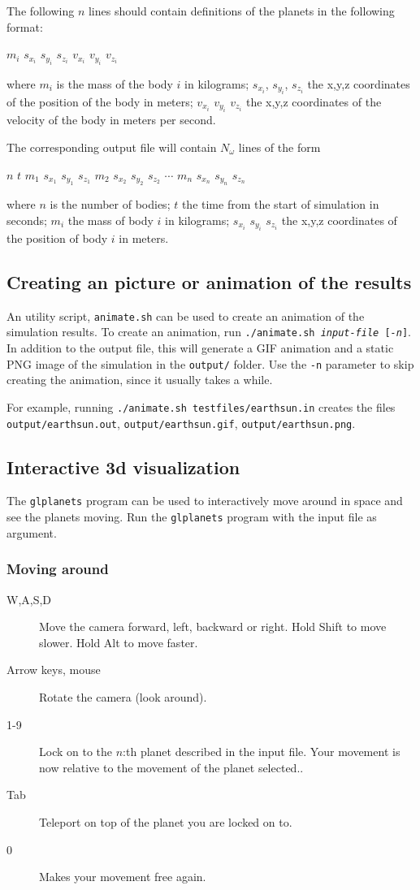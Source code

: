 \documentclass[a4paper]{article}
\begin{document}
   The following $n$ lines should contain definitions of the planets in the following format:
   \begin{center}$m_i$ $s_{x_i}$ $s_{y_i}$ $s_{z_i}$ $v_{x_i}$ $v_{y_i}$ $v_{z_i}$\end{center}
   where $m_i$ is the mass of the body $i$ in kilograms; $s_{x_i}$, $s_{y_i}$, $s_{z_i}$ the x,y,z coordinates of the position of the body in meters; 
   $v_{x_i}$ $v_{y_i}$ $v_{z_i}$ the x,y,z coordinates of the velocity of the body in meters per second.

   The corresponding output file will contain $N_\omega$ lines of the form
   \begin{center} $n$ $t$ $m_1$ $s_{x_1}$ $s_{y_1}$ $s_{z_1}$ $m_2$ $s_{x_2}$ $s_{y_2}$ $s_{z_2}$ $\cdots$ $m_n$ $s_{x_n}$ $s_{y_n}$ $s_{z_n}$\end{center}
   where $n$ is the number of bodies; $t$ the time from the start of simulation in seconds; $m_i$ the mass of body $i$ in kilograms;
   $s_{x_i}$ $s_{y_i}$ $s_{z_i}$ the x,y,z coordinates of the position of body $i$ in meters.
   \subsection{Creating an picture or animation of the results}
   An utility script, \texttt{animate.sh} can be used to create an animation of the simulation results.
   To create an animation, run \texttt{./animate.sh \emph{input-file} [\emph{-n}]}.
   In addition to the output file, this will generate a GIF animation and a static PNG image of the simulation in the \texttt{output/} folder.
   Use the \texttt{-n} parameter to skip creating the animation, since it usually takes a while.

   For example, running \texttt{./animate.sh testfiles/earthsun.in} creates the files \texttt{output/earthsun.out},
   \texttt{output/earthsun.gif}, \texttt{output/earthsun.png}.
   \subsection{Interactive 3d visualization}
   The \texttt{glplanets} program can be used to interactively move around in space and see the planets moving.
   Run the \texttt{glplanets} program with the input file as argument.
   \subsubsection{Moving around}
   \begin{description}
   \item[W,A,S,D] Move the camera forward, left, backward or right. Hold Shift to move slower. Hold Alt to move faster.
   \item[Arrow keys, mouse] Rotate the camera (look around).
   \item[1-9] Lock on to the $n$:th planet described in the input file. Your movement is now relative to the movement of the planet selected..
   \item[Tab] Teleport on top of the planet you are locked on to.
   \item[0] Makes your movement free again.
   \end{description}
\end{document}
